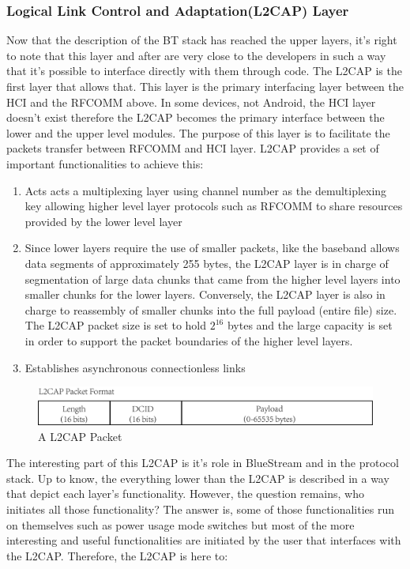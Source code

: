 \documentclass[a4paper,12pt]{article}
\begin{document}
\subsubsection{Logical Link Control and Adaptation(L2CAP) Layer}
Now that the description of the BT stack has reached the upper layers, it’s right to note that this layer and after are very close to the developers in such a way that it's possible to interface directly with them through code. The L2CAP is the first layer that allows that. This layer is the primary interfacing layer between the HCI and the RFCOMM above. In some devices, not Android, the HCI layer doesn’t exist therefore the L2CAP becomes the primary interface between the lower and the upper level modules. The purpose of this layer is to facilitate the packets transfer between RFCOMM and HCI layer. L2CAP provides a set of important functionalities to achieve this:

\begin{enumerate}
\item Acts acts a multiplexing layer using channel number as the demultiplexing key allowing higher level layer protocols such as RFCOMM to share resources provided by the lower level layer
\item Since lower layers require the use of smaller packets, like the baseband allows data segments of approximately 255 bytes, the L2CAP layer is in charge of segmentation of large data chunks that came from the higher level layers into smaller chunks for the lower layers. Conversely, the L2CAP layer is also in charge to reassembly of smaller chunks into the full payload (entire file) size. The L2CAP packet size is set to hold $2^{16}$ bytes and the large capacity is set in order to support the packet boundaries of the higher level layers.
\item Establishes asynchronous connectionless links
\end{enumerate}

\begin{figure}[h!]
\centering
\includegraphics[scale=.8]{Figures/Figure5.png}
\caption{A L2CAP Packet}
\label{fig:L2CAPPacket}
\end{figure}

The interesting part of this L2CAP is it’s role in BlueStream and in the protocol stack. Up to know, the everything lower than the L2CAP is described in a way that depict each layer's functionality. However, the question remains, who initiates all those functionality? The answer is, some of those functionalities run on themselves such as power usage mode switches but most of the more interesting and useful functionalities are initiated by the user that interfaces with the L2CAP. Therefore, the L2CAP is here to:
\end{document}
